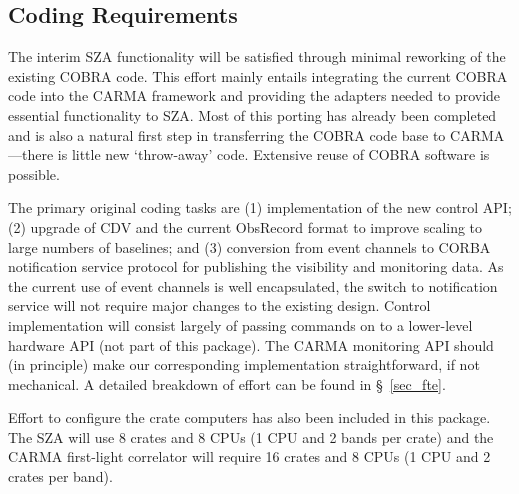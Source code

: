 \documentclass[11pt]{article}
\begin{document}
%
%
\subsection{Coding Requirements}
%
%
The interim SZA functionality will be satisfied through minimal reworking of
the existing COBRA code. This effort mainly entails integrating the current
COBRA code into the CARMA framework and providing the adapters needed to
provide essential functionality to SZA. Most of this porting has already been completed and is
also a natural first step in transferring the COBRA code base to CARMA---there
is little new `throw-away' code. Extensive reuse of COBRA software is
possible.

The primary original coding tasks are (1) implementation of the new control
API; (2) upgrade of CDV and the current ObsRecord format to improve scaling to
large numbers of baselines; and (3) conversion from event channels to CORBA
notification service protocol for publishing the visibility and monitoring
data. As the current use of event channels is well encapsulated, the switch to
notification service will not require major changes to the existing design.
Control implementation will consist largely of passing commands on to a
lower-level hardware API (not part of this package). The CARMA monitoring API
should (in principle) make our corresponding implementation straightforward,
if not mechanical. A detailed breakdown of effort can be found in
\S~\ref{sec_fte}.

Effort to configure the crate computers has also been included in this
package. The SZA will use 8 crates and 8 CPUs (1 CPU and 2 bands per crate)
and the CARMA first-light correlator will require 16 crates and 8 CPUs (1 CPU
and 2 crates per band).

%
%
\end{document}
